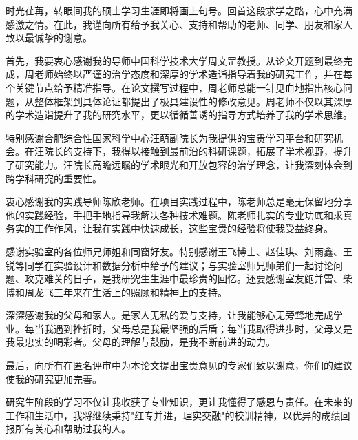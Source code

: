 
\begin{acknowledgements}

时光荏苒，转眼间我的硕士学习生涯即将画上句号。回首这段求学之路，心中充满感激之情。在此，我谨向所有给予我关心、支持和帮助的老师、同学、朋友和家人致以最诚挚的谢意。

首先，我要衷心感谢我的导师中国科学技术大学周文罡教授。从论文开题到最终完成，周老师始终以严谨的治学态度和深厚的学术造诣指导着我的研究工作，并在每个关键节点给予精准指导。在论文撰写过程中，周老师总能一针见血地指出核心问题，从整体框架到具体论证都提出了极具建设性的修改意见。周老师不仅以其深厚的学术造诣提升了我的研究水平，更以循循善诱的指导方式培养了我的学术思维。

特别感谢合肥综合性国家科学中心汪萌副院长为我提供的宝贵学习平台和研究机会。在汪院长的支持下，我得以接触到最前沿的科研课题，拓展了学术视野，提升了研究能力。汪院长高瞻远瞩的学术眼光和开放包容的治学理念，让我深刻体会到跨学科研究的重要性。

衷心感谢我的实践导师陈欣老师。在项目实践过程中，陈老师总是毫无保留地分享他的实践经验，手把手地指导我解决各种技术难题。陈老师扎实的专业功底和求真务实的工作作风，让我在实践中快速成长，这些宝贵的经验将使我受益终身。

感谢实验室的各位师兄师姐和同窗好友。特别感谢王飞博士、赵佳琪、刘雨鑫、王锐等同学在实验设计和数据分析中给予的建议；与实验室师兄师弟们一起讨论问题、攻克难关的日子，是我研究生生涯中最珍贵的回忆。还要感谢室友鲍并雷、柴博和周龙飞三年来在生活上的照顾和精神上的支持。

深深感谢我的父母和家人。是家人无私的爱与支持，让我能够心无旁骛地完成学业。每当我遇到挫折时，父母总是我最坚强的后盾；每当我取得进步时，父母又是我最忠实的喝彩者。父母的理解与鼓励，是我不断前进的动力。

最后，向所有在匿名评审中为本论文提出宝贵意见的专家们致以谢意，你们的建议使我的研究更加完善。

研究生阶段的学习不仅让我收获了专业知识，更让我懂得了感恩与责任。在未来的工作和生活中，我将继续秉持"红专并进，理实交融"的校训精神，以优异的成绩回报所有关心和帮助过我的人。

\end{acknowledgements}
